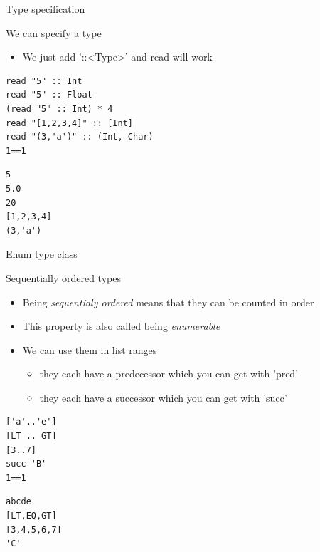 \documentclass[presetation]{beamer}
\begin{document}
\begin{frame}[fragile,label={sec:orgb913419}]{Type specification}
 \begin{block}{We can specify a type}
\begin{itemize}
\item We just add '::<Type>' and read will work
\end{itemize}
\begin{verbatim}
read "5" :: Int
read "5" :: Float
(read "5" :: Int) * 4
read "[1,2,3,4]" :: [Int]
read "(3,'a')" :: (Int, Char)
1==1
\end{verbatim}

\begin{verbatim}
5
5.0
20
[1,2,3,4]
(3,'a')
\end{verbatim}
\end{block}
\end{frame}

\begin{frame}[fragile,label={sec:org933f333}]{Enum type class}
 \begin{block}{Sequentially ordered types}
\begin{itemize}
\item Being \emph{sequentialy ordered} means that they can be counted in order
\item This property is also called being \emph{enumerable}
\item We can use them in list ranges
\begin{itemize}
\item they each have a predecessor which you can get with 'pred'
\item they each have a successor which you can get with 'succ'
\end{itemize}
\end{itemize}
\begin{verbatim}
['a'..'e']
[LT .. GT]
[3..7]
succ 'B'
1==1
\end{verbatim}

\begin{verbatim}
abcde
[LT,EQ,GT]
[3,4,5,6,7]
'C'
\end{verbatim}
\end{block}
\end{frame}
\end{document}
